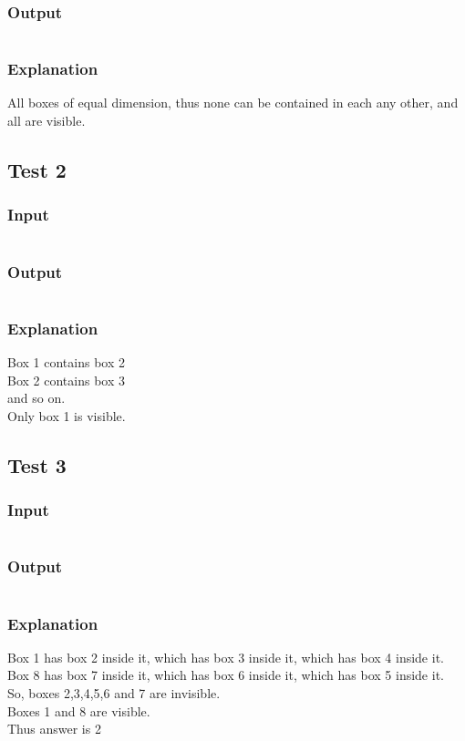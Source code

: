 \documentclass{article}
\begin{document}
\subsubsection*{Output}
\inputminted{sh}{./tests/out1}
\subsubsection*{Explanation}
All boxes of equal dimension, thus none can be contained in each any other, and all are visible.

\subsection{Test 2}
\subsubsection*{Input}
\inputminted{sh}{./tests/in2}
\subsubsection*{Output}
\inputminted{sh}{./tests/out2}
\subsubsection*{Explanation}
Box 1 contains box 2 \\
Box 2 contains box 3 \\
and so on. \\
Only box 1 is visible.

\subsection{Test 3}
\subsubsection*{Input}
\inputminted{sh}{./tests/in3}
\subsubsection*{Output}
\inputminted{sh}{./tests/out3}
\subsubsection*{Explanation}
Box 1 has box 2 inside it, which has box 3 inside it, which has box 4 inside it. \\
Box 8 has box 7 inside it, which has box 6 inside it, which has box 5 inside it. \\
So, boxes 2,3,4,5,6 and 7 are invisible. \\
Boxes 1 and 8 are visible.\\
Thus answer is 2
\end{document}
